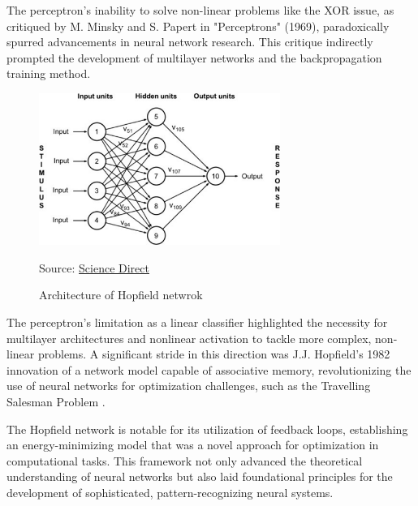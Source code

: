 \documentclass[12pt,a4paper]{report}
\begin{document}
The perceptron's inability to solve non-linear problems like the XOR issue, as critiqued by M. Minsky and S. Papert in "Perceptrons" (1969), paradoxically spurred advancements in neural network research. This critique indirectly prompted the development of multilayer networks and the backpropagation training method.


\begin{figure}[H]
    \centering
    \includegraphics[width=0.7\textwidth]{./data/Architecture of Hopfield netwrok.jpg}
    \caption{Architecture of Hopfield netwrok}
    \label{fig:my_picture}
    \vspace{1pt} %
    \small{Source: \href{https://www.google.com/imgres?q=typical%20Hopfield%20Neural%20Network&imgurl=https%3A%2F%2Fars.els-cdn.com%2Fcontent%2Fimage%2F3-s2.0-B9780128184387000034-f03-02-9780128184387.jpg&imgrefurl=https%3A%2F%2Fwww.sciencedirect.com%2Ftopics%2Fcomputer-science%2Fhopfield-network&docid=_k9vh5pf2EHS1M&tbnid=EjVzB__f42R8iM&vet=12ahUKEwi07IHih_6EAxW1SEEAHX8UAAwQM3oECHQQAA..i&w=505&h=319&hcb=2&ved=2ahUKEwi07IHih_6EAxW1SEEAHX8UAAwQM3oECHQQAA}{Science Direct}}
\end{figure}


The perceptron's limitation as a linear classifier highlighted the necessity for multilayer architectures and nonlinear activation to tackle more complex, non-linear problems. A significant stride in this direction was J.J. Hopfield's 1982 innovation of a network model capable of associative memory, revolutionizing the use of neural networks for optimization challenges, such as the Travelling Salesman Problem \cite{JJHopfield1982NeuralNetworksPhysical}.

The Hopfield network is notable for its utilization of feedback loops, establishing an energy-minimizing model that was a novel approach for optimization in computational tasks. This framework not only advanced the theoretical understanding of neural networks but also laid foundational principles for the development of sophisticated, pattern-recognizing neural systems.
\end{document}
